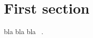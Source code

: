 \documentclass[a4paper,12pt,french]{report}
\begin{document}
 
\section{First section}
 
bla bla bla ~\cite{Kresse1996}.
 

{}

 
\end{document}
